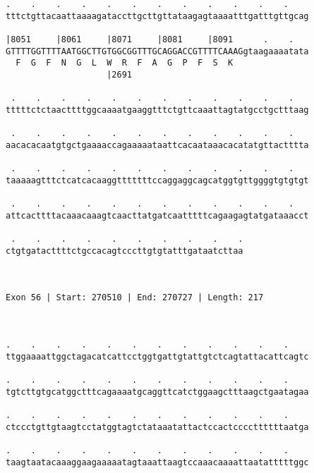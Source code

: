 \documentclass{article}
\begin{document}
\begin{Verbatim}
.    .    .    .    .    .    .    .    .    .    .    .    
tttctgttacaattaaaagataccttgcttgttataagagtaaaatttgatttgttgcag
                                                            
|8051     |8061     |8071     |8081     |8091      .    .   
GTTTTGGTTTTAATGGCTTGTGGCGGTTTGCAGGACCGTTTTCAAAGgtaagaaaatata
  F  G  F  N  G  L  W  R  F  A  G  P  F  S  K               
                    |2691                                   
  
 .    .    .    .    .    .    .    .    .    .    .    .   
tttttctctaacttttggcaaaatgaaggtttctgttcaaattagtatgcctgctttaag
                                                            
 .    .    .    .    .    .    .    .    .    .    .    .   
aacacacaatgtgctgaaaaccagaaaaataattcacaataaacacatatgttactttta
                                                            
 .    .    .    .    .    .    .    .    .    .    .    .   
taaaaagtttctcatcacaaggtttttttccaggaggcagcatggtgttggggtgtgtgt
                                                            
 .    .    .    .    .    .    .    .    .    .    .    .   
attcacttttacaaacaaagtcaacttatgatcaatttttcagaagagtatgataaacct
                                                            
 .    .    .    .    .    .    .    .    .    .
ctgtgatacttttctgccacagtcccttgtgtatttgataatcttaa
                                               
                                               
 
Exon 56 | Start: 270510 | End: 270727 | Length: 217



.    .    .    .    .    .    .    .    .    .    .    .    
ttggaaaattggctagacatcattcctggtgattgtattgtctcagtattacattcagtc
                                                            
.    .    .    .    .    .    .    .    .    .    .    .    
tgtcttgtgcatggctttcagaaaatgcaggttcatctggaagctttaagctgaatagaa
                                                            
.    .    .    .    .    .    .    .    .    .    .    .    
ctccctgttgtaagtcctatggtagtctataaatattactccactccccttttttaatga
                                                            
.    .    .    .    .    .    .    .    .    .    .    .    
taagtaatacaaaggaagaaaaatagtaaattaagtccaaacaaaattaatatttttggc
                                                            

\end{Verbatim}
\end{document}
